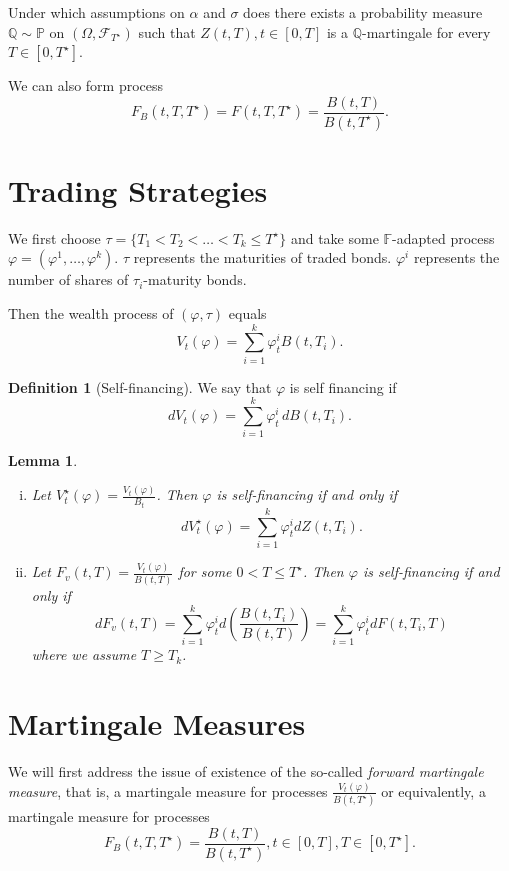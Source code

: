 \documentclass[10pt, oneside, reqno]{amsbook}
\theoremstyle{plain}%
\newtheorem{lem}[thm]{Lemma}
\theoremstyle{definition}
\newtheorem{defn}[thm]{Definition}
\theoremstyle{remark}
\renewcommand{\phi}{\varphi}
\newcommand{\sigf}{\mathcal{F}}
\newcommand{\Q}{\mathbb{Q}}
\renewcommand{\P}{\mathbb{P}}
\newcommand{\F}{\mathbb{F}}
\numberwithin{equation}{chapter}
\begin{document}
Under which assumptions on $\alpha$ and $\sigma$ does there exists a probability measure $\Q \sim \P$ on $(\Omega, \sigf_{T^\star})$ such that $Z(t, T), t \in [0, T]$ is a $\Q$-martingale for every $T \in [0, T^\star]$.

We can also form process \[
	F_B(t, T, T^\star) = F(t, T, T^\star) = \frac{B(t, T)}{B(t, T^\star)}.
\]

\section{Trading Strategies} %
\label{sec:trading_strategies}
We first choose $\tau = \{ T_1 < T_2 < \dots < T_k \leq T^\star \}$ and take some $\F$-adapted process $\phi = (\phi^1, \dots, \phi^k)$.  $\tau$ represents the maturities of traded bonds.  $\phi^i$ represents the number of shares of $\tau_i$-maturity bonds.  

Then the wealth process of $(\phi, \tau)$ equals \[
	V_t(\phi) = \sum_{i=1}^k \phi^i_t B(t, T_i).
\] 

\begin{defn}[Self-financing]
	We say that $\phi$ is self financing if \[
		dV_t(\phi) = \sum_{i=1}^k \phi_t^i \, dB(t, T_i).
	\]
\end{defn}

\begin{lem}{\ }
	\begin{enumerate}[(i)]
		\item 
	Let $V_t^\star(\phi) = \frac{V_t(\phi)}{B_t}$.  Then $\phi$ is self-financing if and only if \[
		dV^\star_t(\phi) = \sum_{i=1}^k \phi_t^i d Z(t, T_i).
 	\] 
		\item 
		Let $F_v(t, T) = \frac{V_t(\phi)}{B(t, T)}$ for some $0 < T \leq T^\star$. Then $\phi$ is self-financing if and only if \[
			dF_v(t, T) = \sum_{i=1}^k \phi^i_t d \left( \frac{B(t, T_i)}{B(t, T)} \right) = \sum_{i=1}^k  \phi^i_t dF(t, T_i, T)
		\] where we assume $T \geq T_k$.
	\end{enumerate}

\end{lem}

\section{Martingale Measures} %
\label{sec:martingale_measures}
We will first address the issue of existence of the so-called \emph{forward martingale measure}, that is, a martingale measure for processes $\frac{V_t(\phi)}{B(t, T^\star)}$ or equivalently, a martingale measure for processes \[
	F_B(t, T, T^\star) = \frac{B(t, T)}{B(t, T^\star)}, t \in [0,T], T \in [0, T^\star].
\]  
\end{document}
